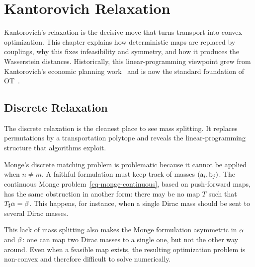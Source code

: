 
\chapter{Kantorovich Relaxation}
\label{sec-kantorovich}

Kantorovich's relaxation is the decisive move that turns transport into convex optimization. This chapter explains how deterministic maps are replaced by couplings, why this fixes infeasibility and symmetry, and how it produces the Wasserstein distances. Historically, this linear-programming viewpoint grew from Kantorovich's economic planning work~\cite{Kantorovich42} and is now the standard foundation of OT~\cite{Villani03,Villani09,rachev1998mass2}.

\section{Discrete Relaxation}
\label{sec-discrete-relaxation}

The discrete relaxation is the cleanest place to see mass splitting. It replaces permutations by a transportation polytope and reveals the linear-programming structure that algorithms exploit.

Monge's discrete matching problem is problematic because it cannot be applied when $n \neq m$. A faithful formulation must keep track of masses $(\mathrm{a}_i,\mathrm{b}_j)$. The continuous Monge problem~\eqref{eq-monge-continuous}, based on push-forward maps, has the same obstruction in another form: there may be no map $T$ such that $T_\sharp\alpha=\beta$. This happens, for instance, when a single Dirac mass should be sent to several Dirac masses.

This lack of mass splitting also makes the Monge formulation asymmetric in $\alpha$ and $\beta$: one can map two Dirac masses to a single one, but not the other way around. Even when a feasible map exists, the resulting optimization problem is non-convex and therefore difficult to solve numerically.

